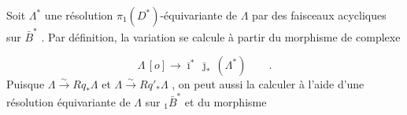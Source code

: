 \begin{center}
\end{center}
Soit $\Lambda^*$ une résolution $\pi_1(D^*)$-équivariante de $\Lambda$ par des faisceaux acycliques sur $\bar{B}^*$ . Par définition, la variation se calcule à partir du morphisme de complexe

\begin{equation*}
\Lambda\,[o] \longrightarrow \bar{\imath}^*\, \bar{\jmath}_*\,(\Lambda^*) \qquad .
\end{equation*}
Puisque $\Lambda \stackrel{\sim}{\longrightarrow} Rq_*\Lambda$ et $\Lambda \stackrel{\sim}{\longrightarrow} Rq'_*\Lambda$ , on peut aussi la calculer  à l'aide d'une résolution équivariante de $\Lambda$ sur ${}_1\bar{B}^*$ et du morphisme

